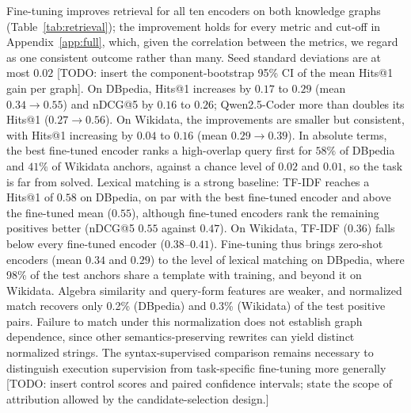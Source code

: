 \documentclass[runningheads]{llncs}
\newcommand{\hp}[1]{{\color{red!75!black}#1}}
\begin{document}
Fine-tuning improves retrieval for all ten encoders on both knowledge graphs
(Table~\ref{tab:retrieval}); the improvement holds for every metric and
cut-off in Appendix~\ref{app:full}, which, given the correlation between the
metrics, we regard as one consistent outcome rather than many. Seed standard
deviations are at most $0.02$ \hp{[TODO: insert the component-bootstrap 95\%
CI of the mean Hits@1 gain per graph]}. On DBpedia,
Hits@1 increases by $0.17$ to $0.29$ (mean $0.34 \rightarrow 0.55$) and nDCG@5
by $0.16$ to $0.26$; Qwen2.5-Coder more than doubles its Hits@1
($0.27 \rightarrow 0.56$). On Wikidata, the improvements are smaller but
consistent, with Hits@1 increasing by $0.04$ to $0.16$ (mean
$0.29 \rightarrow 0.39$). In absolute terms, the best fine-tuned encoder ranks
a high-overlap query first for $58\%$ of DBpedia and $41\%$ of Wikidata
anchors, against a chance level of $0.02$ and $0.01$, so the
task is far from solved. Lexical matching is a strong baseline: TF-IDF
reaches a Hits@1 of $0.58$ on DBpedia, on par with the best fine-tuned
encoder and above the fine-tuned mean ($0.55$), although fine-tuned encoders
rank the remaining positives better (nDCG@5 $0.55$ against $0.47$). On
Wikidata, TF-IDF ($0.36$) falls below every fine-tuned encoder
($0.38$--$0.41$). Fine-tuning thus brings zero-shot encoders (mean $0.34$
and $0.29$) to the level of lexical matching on DBpedia, where 98\% of the
test anchors share a template with training, and beyond it on Wikidata.
Algebra similarity and query-form features are weaker, and normalized match
recovers only 0.2\% (DBpedia) and 0.3\% (Wikidata) of the test positive pairs. Failure to match
under this normalization does not establish graph dependence, since other
semantics-preserving rewrites can yield distinct normalized strings.
The syntax-supervised comparison remains necessary to distinguish execution
supervision from task-specific fine-tuning more generally
\hp{[TODO: insert control scores and paired confidence intervals; state the
scope of attribution allowed by the candidate-selection design.]}
\end{document}
